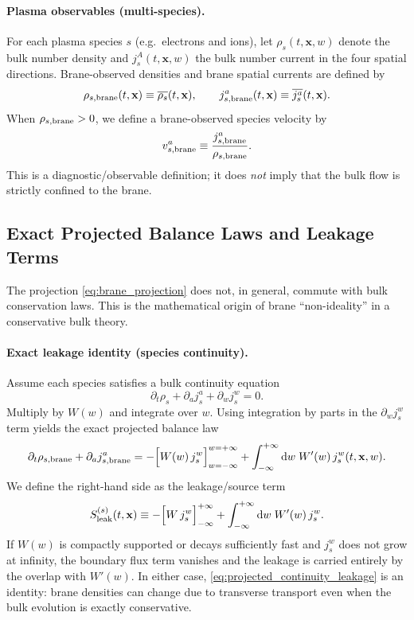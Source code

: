 \documentclass[11pt]{article}
\newcommand{\x}{\mathbf{x}}     %
\newcommand{\W}{W}              %
\newcommand{\Proj}[1]{\overline{#1}} %
\newcommand{\Sleak}{S_{\rm leak}}
\begin{document}
\paragraph{Plasma observables (multi-species).}
For each plasma species \(s\) (e.g.\ electrons and ions), let \(\rho_s(t,\x,w)\)
denote the bulk number density and \(j_s^A(t,\x,w)\) the bulk number current in
the four spatial directions. Brane-observed densities and brane spatial currents
are defined by
\begin{equation}
\rho_{s,\rm brane}(t,\x)\equiv \Proj{\rho_s}(t,\x),
\qquad
j_{s,\rm brane}^a(t,\x)\equiv \Proj{j_s^a}(t,\x).
\label{eq:brane_species_defs}
\end{equation}
When \(\rho_{s,\rm brane}>0\), we define a brane-observed species velocity by
\begin{equation}
v_{s,\rm brane}^a \equiv \frac{j_{s,\rm brane}^a}{\rho_{s,\rm brane}}.
\label{eq:brane_velocity_def}
\end{equation}
This is a diagnostic/observable definition; it does \emph{not} imply that the bulk
flow is strictly confined to the brane.

\subsection{Exact Projected Balance Laws and Leakage Terms}
\label{sec:leakage_identity}

The projection \eqref{eq:brane_projection} does not, in general, commute with bulk
conservation laws. This is the mathematical origin of brane ``non-ideality'' in a
conservative bulk theory.

\paragraph{Exact leakage identity (species continuity).}
Assume each species satisfies a bulk continuity equation
\begin{equation}
\partial_t\rho_s + \partial_a j_s^a + \partial_w j_s^w = 0.
\label{eq:bulk_continuity_species}
\end{equation}
Multiply by \(\W(w)\) and integrate over \(w\). Using integration by parts in the
\(\partial_w j_s^w\) term yields the exact projected balance law
\begin{equation}
\partial_t \rho_{s,\rm brane} + \partial_a j_{s,\rm brane}^a
=
-\Big[\W(w)\,j_s^w\Big]_{w=-\infty}^{w=+\infty}
+\int_{-\infty}^{+\infty}\dd w\;\W'(w)\,j_s^w(t,\x,w).
\label{eq:projected_continuity_leakage}
\end{equation}
We define the right-hand side as the leakage/source term
\begin{equation}
\Sleak^{(s)}(t,\x)
\equiv
-\Big[\W\,j_s^w\Big]_{-\infty}^{+\infty}
+\int_{-\infty}^{+\infty}\dd w\;\W'(w)\,j_s^w.
\label{eq:Sleak_def}
\end{equation}
If \(\W(w)\) is compactly supported or decays sufficiently fast and \(j_s^w\) does
not grow at infinity, the boundary flux term vanishes and the leakage is carried
entirely by the overlap with \(\W'(w)\). In either case, \eqref{eq:projected_continuity_leakage}
is an identity: brane densities can change due to transverse transport even when
the bulk evolution is exactly conservative.
\end{document}
